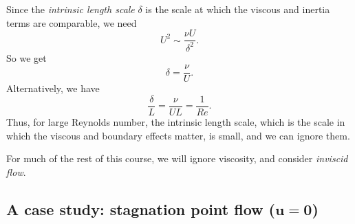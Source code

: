 \documentclass[a4paper]{article}
\begin{document}
Since the \emph{intrinsic length scale} $\delta$ is the scale at which the viscous and inertia terms are comparable, we need
\[
  U^2 \sim \frac{\nu U}{\delta^2}.
\]
So we get
\[
  \delta = \frac{\nu}{U}.
\]
Alternatively, we have
\[
  \frac{\delta}{L} = \frac{\nu}{UL} = \frac{1}{Re}.
\]
Thus, for large Reynolds number, the intrinsic length scale, which is the scale in which the viscous and boundary effects matter, is small, and we can ignore them.

For much of the rest of this course, we will ignore viscosity, and consider \emph{inviscid flow}.

\subsection{A case study: stagnation point flow (\texorpdfstring{$\mathbf{u} = \mathbf{0}$}{u = 0})}
\end{document}
